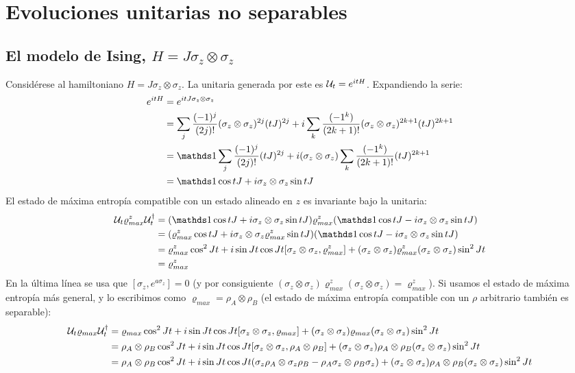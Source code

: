 \section{Evoluciones unitarias no separables}
\subsection{El modelo de Ising, $H=J\sigma_{z}\otimes\sigma_{z}$}\label{sec:Ising}
Considérese al hamiltoniano $H=J\sigma_{z}\otimes\sigma_{z}$. La unitaria generada por este es $\mathcal{U}_{t}=e^{itH}$. Expandiendo la serie:
\begin{align*}
    e^{itH}&=e^{itJ\sigma_{z}\otimes\sigma_{z}}\\
    &=\sum_{j}\frac{(-1)^{j}}{(2j)!}(\sigma_{z}\otimes\sigma_{z})^{2j}(tJ)^{2j}+i\sum_{k}\frac{(-1^{k})}{(2k+1)!}(\sigma_{z}\otimes\sigma_{z})^{2k+1}(tJ)^{2k+1}\\
    &=\Id\sum_{j}\frac{(-1)^{j}}{(2j)!}(tJ)^{2j}+i(\sigma_{z}\otimes\sigma_{z})\sum_{k}\frac{(-1^{k})}{(2k+1)!}(tJ)^{2k+1}\\
    &=\Id \cos{tJ} + i\sigma_{z}\otimes\sigma_{z}\sin{tJ}
\end{align*}
El estado de máxima entropía compatible con un estado alineado en $z$ es invariante bajo la unitaria:
\begin{align*}
    \mcU_{t}\varrho_{max}^{z}\mcU_{t}^{\dag}&=(\Id \cos{tJ} + i\sigma_{z}\otimes\sigma_{z}\sin{tJ})\varrho_{max}^{z}(\Id \cos{tJ} - i\sigma_{z}\otimes\sigma_{z}\sin{tJ})\\
    &=(\varrho_{max}^{z} \cos{tJ} + i\sigma_{z}\otimes\sigma_{z}\varrho_{max}^{z}\sin{tJ})(\Id \cos{tJ} - i\sigma_{z}\otimes\sigma_{z}\sin{tJ})\\
    &=\varrho_{max}^{z} \cos^{2}{Jt}+i\sin{Jt}\cos{Jt}[\sigma_{z}\otimes\sigma_{z},\varrho_{max}^{z}]+(\sigma_{z}\otimes\sigma_{z}) \varrho_{max}^{z} (\sigma_{z}\otimes\sigma_{z}) \sin^{2}{Jt}\\
    &=\varrho_{max}^{z}
\end{align*}
En la última línea se usa que $[\sigma_{z},e^{a\sigma_{z}}]=0$ (y por consiguiente $(\sigma_{z}\otimes\sigma_{z}) \varrho_{max}^{z} (\sigma_{z}\otimes\sigma_{z})=\varrho_{max}^{z}$). Si usamos el estado de máxima entropía más general, y lo escribimos como $\varrho_{max}=\rho_{A}\otimes\rho_{B}$ (el estado de máxima entropía compatible con un $\rho$ arbitrario también es separable):
\begin{align*}
    \mathcal{U}_{t}\varrho_{max}\mathcal{U}_{t}^{\dag}&=\varrho_{max}\cos^{2}{Jt}+i\sin{Jt}\cos{Jt}[\sigma_{z}\otimes\sigma_{z},\varrho_{max}]+(\sigma_{z}\otimes\sigma_{z}) \varrho_{max} (\sigma_{z}\otimes\sigma_{z}) \sin^{2}{Jt}\\
    &=\rho_{A}\otimes\rho_{B}\cos^{2}{Jt}+i\sin{Jt}\cos{Jt}[\sigma_{z}\otimes\sigma_{z},\rho_{A}\otimes\rho_{B}]+(\sigma_{z}\otimes\sigma_{z}) \rho_{A}\otimes\rho_{B} (\sigma_{z}\otimes\sigma_{z}) \sin^{2}{Jt}\\
    &=\rho_{A}\otimes\rho_{B}\cos^{2}{Jt}+i\sin{Jt}\cos{Jt}(\sigma_{z}\rho_{A}\otimes\sigma_{z}\rho_{B} - \rho_{A}\sigma_{z}\otimes\rho_{B}\sigma_{z})+(\sigma_{z}\otimes\sigma_{z}) \rho_{A}\otimes\rho_{B} (\sigma_{z}\otimes\sigma_{z}) \sin^{2}{Jt}
\end{align*}
